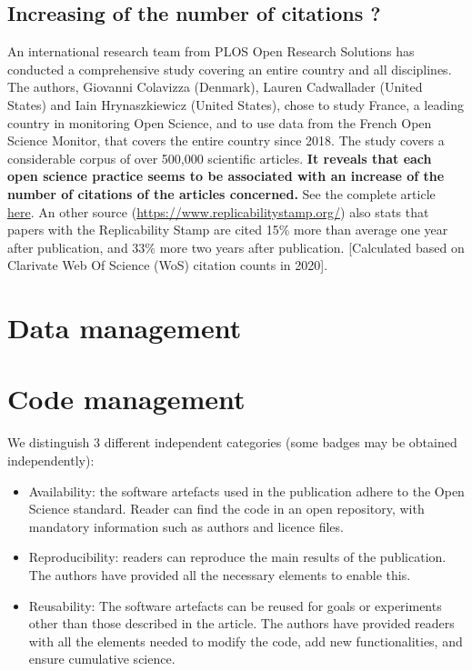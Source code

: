 \subsection{Increasing of the number of citations ?}
An international research team from PLOS Open Research Solutions has conducted a comprehensive study covering an entire country and all disciplines. The authors, Giovanni Colavizza (Denmark), Lauren Cadwallader (United States) and Iain Hrynaszkiewicz (United States), chose to study France, a leading country in monitoring Open Science, and to use data from the French Open Science Monitor, that covers the entire country since 2018.
The study covers a considerable corpus of over 500,000 scientific articles. \textbf{It reveals that each open science practice seems to be associated with an increase of the number of citations of the articles concerned.}
See the complete article \href{https://www.ouvrirlascience.fr/for-the-first-time-on-a-scale-of-a-country-france-a-study-demonstrates-that-open-science-could-increase-the-chances-for-researchers-to-be-cited/}{here}.
An other source (\href{https://www.replicabilitystamp.org/}{https://www.replicabilitystamp.org/}) also stats that papers with the Replicability Stamp are cited 15$\%$ more than average one year after publication, and 33$\%$ more two years after publication. [Calculated based on Clarivate Web Of Science (WoS) citation counts in 2020].

\section{Data management}

\section{Code management}
We distinguish 3 different independent categories (some badges may be obtained independently):

\begin{itemize}
\item Availability: the software artefacts used in the publication adhere to the Open Science standard. Reader can find the code in an open repository, with mandatory information such as authors and licence files. 

\item Reproducibility: readers can reproduce the main results of the publication. The authors have provided all the necessary elements to enable this.
  
\item Reusability: The software artefacts can be reused for goals or experiments other than those described in the article. The authors have provided readers with all the elements needed to modify the code, add new functionalities, and ensure cumulative science. 
\end{itemize}

